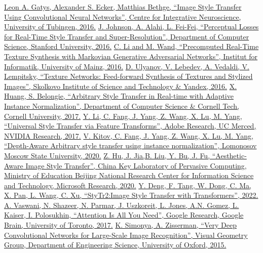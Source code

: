 \documentclass{article}
\begin{document}
\begin{thebibliography}{9}
    \href{https://www.cv-foundation.org/openaccess/content_cvpr_2016/papers/Gatys_Image_Style_Transfer_CVPR_2016_paper.pdf}{Leon A. Gatys, Alexander S. Ecker, Matthias Bethge, “Image Style Transfer Using Convolutional Neural Networks”, Centre for Integrative Neuroscience, University of Tubingen, 2016.}
    \href{https://arxiv.org/pdf/1603.08155}{J. Johnson, A. Alahi, L. Fei-Fei, “Perceptual Losses for Real-Time Style Transfer and Super-Resolution”, Department of Computer Science, Stanford University, 2016.}
    \href{https://arxiv.org/pdf/1604.04382}{C. Li and M. Wand, “Precomputed Real-Time Texture Synthesis with Markovian Generative Adversarial Networks”, Institut for Informatik, University of Mainz, 2016.}
    \href{https://arxiv.org/pdf/1603.03417}{D. Ulyanov, V. Lebedev, A. Vedaldi, V. Lempitsky, “Texture Networks: Feed-forward Synthesis of Textures and Stylized Images”, Skolkovo Institute of Science and Technology \& Yandex, 2016.}
    \href{https://arxiv.org/pdf/1703.06868}{X. Huang, S. Belongie, “Arbitrary Style Transfer in Real-time with Adaptive Instance Normalization”, Department of Computer Science \& Cornell Tech, Cornell University, 2017.}
    \href{https://arxiv.org/pdf/1705.08086}{Y. Li, C. Fang, J. Yang, Z. Wang, X. Lu, M. Yang, “Universal Style Transfer via Feature Transforms”, Adobe Research, UC Merced, NVIDIA Research, 2017.}
    \href{https://arxiv.org/pdf/1705.08086}{V. Kitov, C. Fang, J. Yang, Z. Wang, X. Lu, M. Yang, “Depth-Aware Arbitrary style transfer using instance normalization”, Lomonosov Moscow State University, 2020.}
    \href{https://hcsi.cs.tsinghua.edu.cn/Paper/Paper20/MM20-HUZHIYUAN.pdf}{Z. Hu, J. Jia,B. Liu, Y. Bu, J. Fu, “Aesthetic-Aware Image Style Transfer”, China Key Laboratory of Pervasive Computing, Ministry of Education Beijing National Research Center for Information Science and Technology, Microsoft Research, 2020.}
    \href{https://arxiv.org/pdf/2105.14576}{Y. Deng, F. Tang, W. Dong, C. Ma, X. Pan, L. Wang, C. Xu, “StyTr2:Image Style Transfer with Transformers”, 2022.}
   \href{https://arxiv.org/pdf/2105.14576}{A. Vaswani, N. Shazeer, N. Parmar, J. Uszkoreit, L. Jones, A.N. Gomez, L. Kaiser, I. Polosukhin, “Attention Is All You Need”, Google Research, Google Brain, University of Toronto, 2017.}
   \href{https://arxiv.org/pdf/1409.1556}{K. Simonya, A. Zisserman, “Very Deep Convolutional Networks for Large-Scale Image Recognition”, Visual Geometry Group, Department of Engineering Science, University of Oxford, 2015.}
\end{thebibliography}
\end{document}
